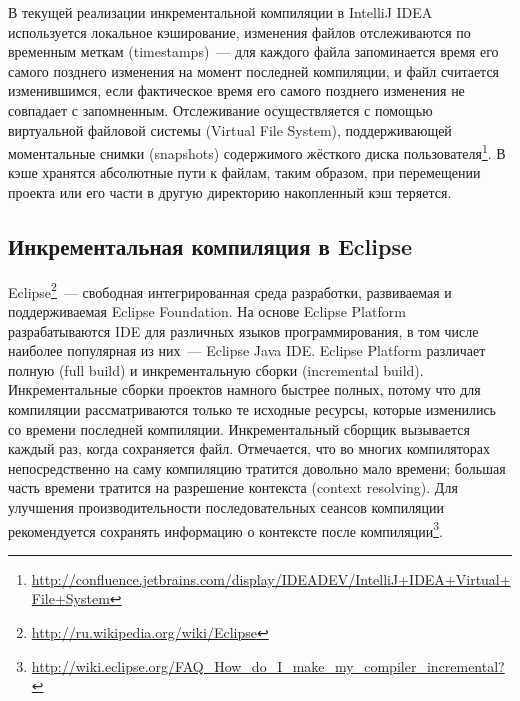 В текущей реализации инкрементальной компиляции в IntelliJ IDEA используется локальное кэширование, изменения файлов отслеживаются по временным меткам (timestamps)~--- для каждого файла запоминается время его самого позднего изменения на момент последней компиляции, и файл считается изменившимся, если фактическое время его самого позднего изменения не совпадает с запомненным. Отслеживание осуществляется с помощью виртуальной файловой системы (Virtual File System), поддерживающей моментальные снимки (snapshots) содержимого жёсткого диска пользователя\footnote{\url{http://confluence.jetbrains.com/display/IDEADEV/IntelliJ+IDEA+Virtual+File+System}}. В кэше хранятся абсолютные пути к файлам, таким образом, при перемещении проекта или его части в другую директорию накопленный кэш теряется.

\subsection{Инкрементальная компиляция в Eclipse}
Eclipse\footnote{\url{http://ru.wikipedia.org/wiki/Eclipse}}~--- свободная интегрированная среда разработки, развиваемая и поддерживаемая Eclipse Foundation. На основе Eclipse Platform разрабатываются IDE для различных языков программирования, в том числе наиболее популярная из них~--- Eclipse Java IDE.
Eclipse Platform различает полную (full build) и инкрементальную сборки (incremental build). Инкрементальные сборки проектов намного быстрее полных, потому что для компиляции рассматриваются только те исходные ресурсы, которые изменились со времени последней компиляции.
Инкрементальный сборщик вызывается каждый раз, когда сохраняется файл. Отмечается, что во многих компиляторах непосредственно на саму компиляцию тратится довольно мало времени; большая часть времени тратится на разрешение контекста (context resolving). Для улучшения производительности последовательных сеансов компиляции рекомендуется сохранять информацию о контексте после компиляции\footnote{\url{http://wiki.eclipse.org/FAQ_How_do_I_make_my_compiler_incremental?}}.

